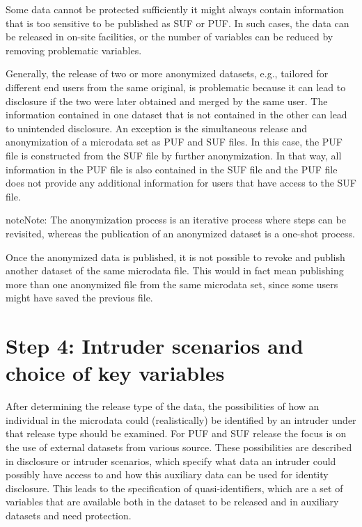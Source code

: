 \documentclass[letterpaper,10pt,english]{sphinxmanual}
\begin{document}
Some data cannot be protected sufficiently \textendash{} it might always
contain information that is too sensitive to be published as SUF or PUF.
In such cases, the data can be released in on-site facilities, or the
number of variables can be reduced by removing problematic variables.

Generally, the release of two or more anonymized datasets, e.g.,
tailored for different end users from the same original, is problematic
because it can lead to disclosure if the two were later obtained and
merged by the same user. The information contained in one dataset that
is not contained in the other can lead to unintended disclosure. An
exception is the simultaneous release and anonymization of a microdata
set as PUF and SUF files. In this case, the PUF file is constructed from
the SUF file by further anonymization. In that way, all information in
the PUF file is also contained in the SUF file and the PUF file does not
provide any additional information for users that have access to the SUF
file.

\begin{sphinxadmonition}{note}{Note:}
The anonymization process is an iterative process where steps
can be revisited, whereas the publication of an anonymized dataset is a
one-shot process.
\end{sphinxadmonition}

Once the anonymized data is published, it is not
possible to revoke and publish another dataset of the same microdata
file. This would in fact mean publishing more than one anonymized file
from the same microdata set, since some users might have saved the
previous file.


\section{Step 4: Intruder scenarios and choice of key variables}
\label{\detokenize{process:step-4-intruder-scenarios-and-choice-of-key-variables}}
After determining the release type of the data, the possibilities of how
an individual in the microdata could (realistically) be identified by an
intruder under that release type should be examined. For PUF and SUF
release the focus is on the use of external datasets from various
source. These possibilities are described in disclosure or intruder
scenarios, which specify what data an intruder could possibly have
access to and how this auxiliary data can be used for identity
disclosure. This leads to the specification of quasi-identifiers, which
are a set of variables that are available both in the dataset to be
released and in auxiliary datasets and need protection.
\end{document}
